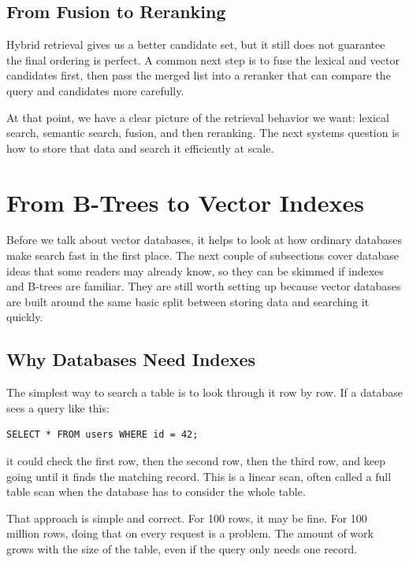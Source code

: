 \documentclass[12pt]{article}
\begin{document}
\subsection{From Fusion to Reranking}

Hybrid retrieval gives us a better candidate set, but it still does not
guarantee the final ordering is perfect. A common next step is to fuse the
lexical and vector candidates first, then pass the merged list into a
reranker that can compare the query and candidates more carefully.

At that point, we have a clear picture of the retrieval behavior we want:
lexical search, semantic search, fusion, and then reranking. The next
systems question is how to store that data and search it efficiently at
scale.

\section{From B-Trees to Vector Indexes}

Before we talk about vector databases, it helps to look at how ordinary
databases make search fast in the first place. The next couple of
subsections cover database ideas that some readers may already know, so
they can be skimmed if indexes and B-trees are familiar. They are still
worth setting up because vector databases are built around the same basic
split between storing data and searching it quickly.

\subsection{Why Databases Need Indexes}

The simplest way to search a table is to look through it row by row. If a
database sees a query like this:

\begin{verbatim}
SELECT * FROM users WHERE id = 42;
\end{verbatim}

it could check the first row, then the second row, then the third row, and
keep going until it finds the matching record. This is a linear scan,
often called a full table scan when the database has to consider the
whole table.

That approach is simple and correct. For 100 rows, it may be fine. For
100 million rows, doing that on every request is a problem. The amount of
work grows with the size of the table, even if the query only needs one
record.
\end{document}
